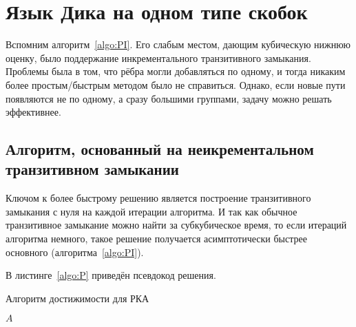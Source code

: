 \section{Язык Дика на одном типе скобок}\label{section:dyck_1}

Вспомним алгоритм~\ref{algo:PI}. Его слабым местом, дающим кубическую нижнюю оценку, было поддержание инкрементального транзитивного замыкания. Проблемы была в том, что рёбра могли добавляться по одному, и тогда никаким более простым/быстрым методом было не справиться. Однако, если новые пути появляются не по одному, а сразу большими группами, задачу можно решать эффективнее.

\subsection{Алгоритм, основанный на неикрементальном \\транзитивном замыкании}\label{subsection:nitc}

Ключом к более быстрому решению является построение транзитивного замыкания с нуля на каждой итерации алгоритма. И так как обычное транзитивное замыкание можно найти за субкубическое время, то если итераций алгоритма немного, такое решение получается асимптотически быстрее основного (алгоритма~\ref{algo:PI}).

В листинге~\ref{algo:P} приведён псевдокод решения.

\begin{algorithm}[h]
    \begin{algorithmic}[1]
    \caption{Алгоритм достижимости для РКА}
    \label{algo:P}
                        \EndIf
                    \EndFor
               \EndFor
            \EndFor
        \EndWhile
    \State \Return $A$
    \EndFunction
    \end{algorithmic}
\end{algorithm}

